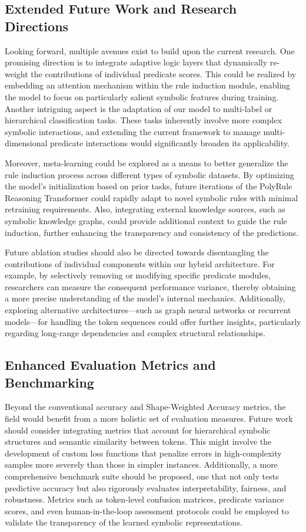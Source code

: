 \documentclass{article}
\begin{document}
\subsection*{Extended Future Work and Research Directions}
Looking forward, multiple avenues exist to build upon the current research. One promising direction is to integrate adaptive logic layers that dynamically re-weight the contributions of individual predicate scores. This could be realized by embedding an attention mechanism within the rule induction module, enabling the model to focus on particularly salient symbolic features during training. Another intriguing aspect is the adaptation of our model to multi-label or hierarchical classification tasks. These tasks inherently involve more complex symbolic interactions, and extending the current framework to manage multi-dimensional predicate interactions would significantly broaden its applicability. 

Moreover, meta-learning could be explored as a means to better generalize the rule induction process across different types of symbolic datasets. By optimizing the model’s initialization based on prior tasks, future iterations of the PolyRule Reasoning Transformer could rapidly adapt to novel symbolic rules with minimal retraining requirements. Also, integrating external knowledge sources, such as symbolic knowledge graphs, could provide additional context to guide the rule induction, further enhancing the transparency and consistency of the predictions. 

Future ablation studies should also be directed towards disentangling the contributions of individual components within our hybrid architecture. For example, by selectively removing or modifying specific predicate modules, researchers can measure the consequent performance variance, thereby obtaining a more precise understanding of the model’s internal mechanics. Additionally, exploring alternative architectures—such as graph neural networks or recurrent models—for handling the token sequences could offer further insights, particularly regarding long-range dependencies and complex structural relationships.

\subsection*{Enhanced Evaluation Metrics and Benchmarking}
Beyond the conventional accuracy and Shape-Weighted Accuracy metrics, the field would benefit from a more holistic set of evaluation measures. Future work should consider integrating metrics that account for hierarchical symbolic structures and semantic similarity between tokens. This might involve the development of custom loss functions that penalize errors in high-complexity samples more severely than those in simpler instances. Additionally, a more comprehensive benchmark suite should be proposed, one that not only tests predictive accuracy but also rigorously evaluates interpretability, fairness, and robustness. Metrics such as token-level confusion matrices, predicate variance scores, and even human-in-the-loop assessment protocols could be employed to validate the transparency of the learned symbolic representations. 
\end{document}
